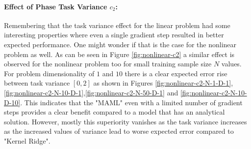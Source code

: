 \paragraph{Effect of Phase Task Variance $c_2$:} Remembering that the task variance effect for the linear problem had some interesting properties where even a single gradient step resulted in better expected performance. One might wonder if that is the case for the nonlinear problem as well. As can be seen in Figure \ref{fig:nonlinear-c2} a similar effect is observed for the nonlinear problem too for small training sample size $N$ values. For problem dimensionality of $1$ and  $10$ there is a clear expected error rise between task variance $[0,2]$ as shown in Figures \ref{fig:nonlinear-c2-N-1-D-1},\ref{fig:nonlinear-c2-N-10-D-1},\ref{fig:nonlinear-c2-N-50-D-1} and \ref{fig:nonlinear-c2-N-10-D-10}. This indicates that the "MAML" even with a limited number of gradient steps provides a clear benefit compared to a model that has an analytical solution. However, mostly this superiority vanishes as the task variance increases as the increased values of variance lead to worse expected error compared to "Kernel Ridge".

